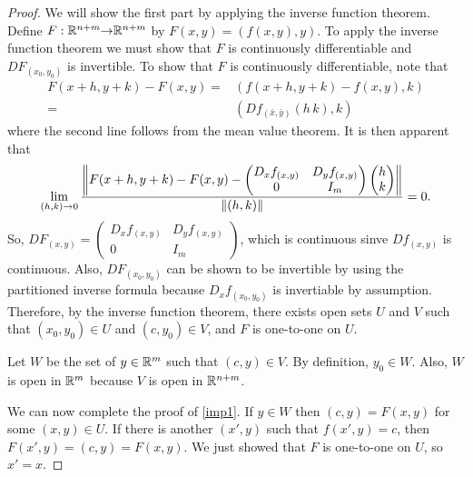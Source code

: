 \begin{proof}
  We will show the first part by applying the inverse function
  theorem. Define $F:\mathbb{R}^{n+m} {\rightarrow} \mathbb{R}^{n+m}$ by $F(x,y) =
  (f(x,y),y)$.
  To apply the inverse function theorem we must show that $F$ is
  continuously differentiable and $DF_{(x_0,y_0)}$ is invertible. To
  show that $F$ is continuously differentiable, note that
  \begin{align*}
    F(x+h,y+k)  - F(x,y) = & (f(x+h,y+k) - f(x,y), k) \\
    = & (Df_{(\bar{x},\bar{y})}(h\, k) , k) 
  \end{align*}
  where the second line follows from the mean value theorem. It is
  then apparent that
  \begin{align*}
    \lim_{(h,k) {\rightarrow} 0} \frac{ \left\Vert { F(x+h,y+k)  - F(x,y)
        - \begin{pmatrix} D_xf_{(x,y)} & D_yf_{(x,y)} \\
          0 & I_m \end{pmatrix} \begin{pmatrix} h \\ k \end{pmatrix}} \right\Vert }
    {\left\Vert {(h,k)} \right\Vert} = 0.
  \end{align*}
  So, $DF_{(x,y)} = \begin{pmatrix} D_xf_{(x,y)} &  D_yf_{(x,y)}  \\
    0 & I_m \end{pmatrix}$, which is continuous
  sinve $Df_{(x,y)}$ is continuous. Also, $DF_{(x_0,y_0)}$ can be
  shown to be invertible by using the partitioned inverse formula
  because $D_xf_{(x_0,y_0)}$ is invertiable by assumption. Therefore,
  by the inverse function theorem, there exists open sets $U$ and $V$
  such that $(x_0, y_0) \in U$ and $(c,y_0) \in V$, and $F$ is
  one-to-one on $U$. 
  
  Let $W$ be the set of $y \in \mathbb{R}^m$ such that $(c,y) \in V$. By
  definition, $y_0 \in W$. Also, $W$ is open in $\mathbb{R}^m$ because $V$ is
  open in $\mathbb{R}^{n+m}$. 
  
  We can now complete the proof of \ref{imp1}. If $y \in W$ then
  $(c,y) = F(x,y)$ for some $(x,y) \in U$. If there is another
  $(x',y)$ such that $f(x',y) = c$, then $F(x',y) = (c,y) =
  F(x,y)$. We just showed that $F$ is one-to-one on $U$, so $x'=x$.  
 

\end{proof}
